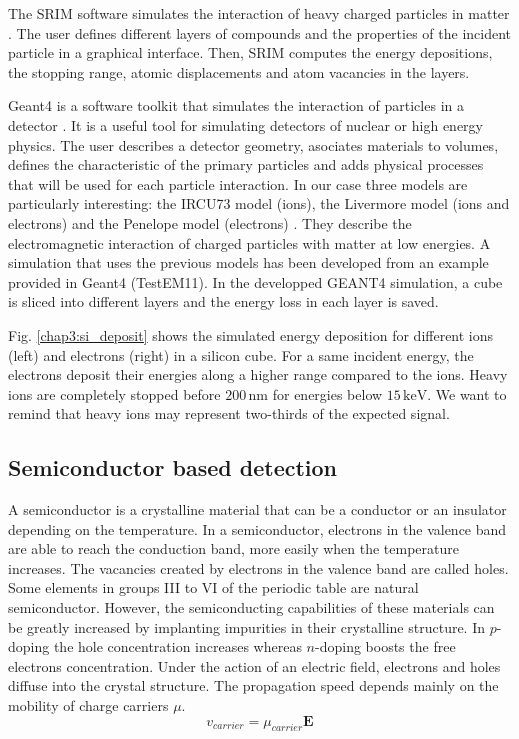 \begin{refsection}
  The SRIM software simulates the interaction of heavy charged particles in matter \cite{srim2013}. The user defines different layers of compounds and the properties of the incident particle in a graphical interface. Then, SRIM computes the energy depositions, the stopping range, atomic displacements and atom vacancies in the layers.

  Geant4 is a software toolkit that simulates the interaction of particles in a detector \cite{Allison2006, Allison2016}. It is a useful tool for simulating detectors of nuclear or high energy physics. The user describes a detector geometry, asociates materials to volumes, defines the characteristic of the primary particles and adds physical processes that will be used for each particle interaction.
  In our case three models are particularly interesting: the IRCU73 model (ions), the Livermore model (ions and electrons) and the Penelope model (electrons) \cite{Bimbot73,livermore97, salvat2009}. They describe the electromagnetic interaction of charged particles with matter at low energies. A simulation that uses the previous models has been developed from an example provided in Geant4 (TestEM11). In the developped GEANT4 simulation, a cube is sliced into different layers and the energy loss in each layer is saved.

  

  Fig. \ref{chap3:si_deposit} shows the simulated energy deposition for different ions (left) and electrons (right) in a silicon cube. For a same incident energy, the electrons deposit their energies along a higher range compared to the ions. Heavy ions are completely stopped before $200\,\mathrm{nm}$ for energies below $15\,\mathrm{keV}$. We want to remind that heavy ions may represent two-thirds of the expected signal.

  \subsection{Semiconductor based detection}
  A semiconductor is a crystalline material that can be a conductor or an insulator depending on the temperature. In a semiconductor, electrons in the valence band are able to reach the conduction band, more easily when the temperature increases. The vacancies created by electrons in the valence band are called holes. Some elements in groups III to VI of the periodic table are natural semiconductor. However, the semiconducting capabilities of these materials can be greatly increased by implanting impurities in their crystalline structure. In $p$-doping the hole concentration increases whereas $n$-doping boosts the free electrons concentration. Under the action of an electric field, electrons and holes diffuse into the crystal structure. The propagation speed depends mainly on the mobility of charge carriers $\mu$.
  \begin{equation}
    v_{carrier} =\mu_{carrier} \boldsymbol{E}
  \end{equation}


\end{refsection}
